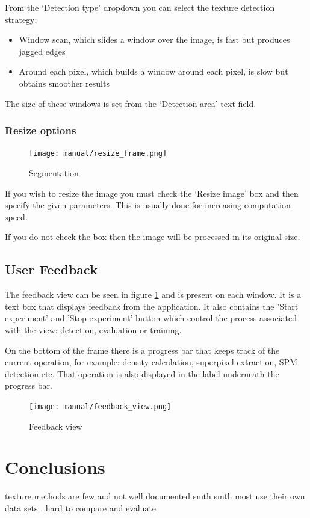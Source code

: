 \documentclass[12pt]{report}
\begin{document}
	From the ‘Detection type’ dropdown you can select the texture detection strategy:
	\begin{itemize}
		\item Window scan, which slides a window over the image, is fast but produces jagged edges
		\item Around each pixel, which builds a window around each pixel, is slow but obtains smoother results
	\end{itemize}
	
	The size of these windows is set from the ‘Detection area’ text field.
	
	\subsection{Resize options}
	
	\begin{figure}
		\begin{center}
			\texttt{[image: manual/resize\_frame.png]}
		\end{center}
		\caption{Segmentation}
	\end{figure}

	If you wish to resize the image you must check the ‘Resize image’ box and then specify the given parameters. This is usually done for increasing computation speed.
	
	If you do not check the box then the image will be processed in its original size.
	
	\section{User Feedback}
	
	The feedback view can be seen in figure \ref{feedback_view} and is present on each window. It is a text box that displays feedback from the application. It also contains the 'Start experiment' and 'Stop experiment' button which control the process associated with the view: detection, evaluation or training.
	
	On the bottom of the frame there is a progress bar that keeps track of the current operation, for example: density calculation, superpixel extraction, SPM detection etc. That operation is also displayed in the label underneath the progress bar.
	
	
	\begin{figure}[h!]
		\centering
		\texttt{[image: manual/feedback\_view.png]}
		\caption{Feedback view}
		\label{feedback_view}
	\end{figure}
	
	\chapter{Conclusions}
	
	texture methods are few and not well documented smth smth most use their own data sets , hard to compare and evaluate
	
	\newpage
	
	
\end{document}
